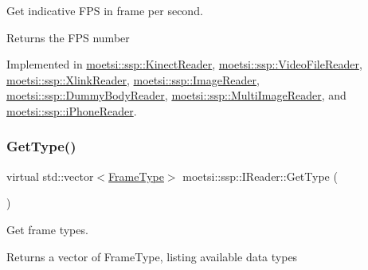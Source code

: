 Get indicative F\+PS in frame per second. 

\begin{DoxyReturn}{Returns}
the F\+PS number 
\end{DoxyReturn}


Implemented in \hyperlink{classmoetsi_1_1ssp_1_1KinectReader_ac88c13693ce8e2e249438ac8de8a7b3c}{moetsi\+::ssp\+::\+Kinect\+Reader}, \hyperlink{classmoetsi_1_1ssp_1_1VideoFileReader_a83359ad82898acdb75240568b182247c}{moetsi\+::ssp\+::\+Video\+File\+Reader}, \hyperlink{classmoetsi_1_1ssp_1_1XlinkReader_accfec6799b561107f27240e5324aa5d4}{moetsi\+::ssp\+::\+Xlink\+Reader}, \hyperlink{classmoetsi_1_1ssp_1_1ImageReader_a86adfec8106c366aaf1ec63e2a7da156}{moetsi\+::ssp\+::\+Image\+Reader}, \hyperlink{classmoetsi_1_1ssp_1_1DummyBodyReader_a7dab48cb8ec247add0c57d98e6cd5fb4}{moetsi\+::ssp\+::\+Dummy\+Body\+Reader}, \hyperlink{classmoetsi_1_1ssp_1_1MultiImageReader_ad0a249af66f8e1a063c3e575fc1b94cb}{moetsi\+::ssp\+::\+Multi\+Image\+Reader}, and \hyperlink{classmoetsi_1_1ssp_1_1iPhoneReader_a4bb216847a6c2ed8eb5d31788a0b8477}{moetsi\+::ssp\+::i\+Phone\+Reader}.

\mbox{\label{classmoetsi_1_1ssp_1_1IReader_a4116c1931fde7bd66133934ffdca1cce}} 
\subsubsection{\texorpdfstring{Get\+Type()}{GetType()}\hspace{0.1cm}{\footnotesize\ttfamily [1/2]}}
{\footnotesize\ttfamily virtual std\+::vector$<$\hyperlink{namespacemoetsi_1_1ssp_a46efdfa2cd5a28ead465dcc8006b5a87}{Frame\+Type}$>$ moetsi\+::ssp\+::\+I\+Reader\+::\+Get\+Type (\begin{DoxyParamCaption}{ }\end{DoxyParamCaption})\hspace{0.3cm}{\ttfamily [pure virtual]}}



Get frame types. 

\begin{DoxyReturn}{Returns}
a vector of Frame\+Type, listing available data types 
\end{DoxyReturn}



